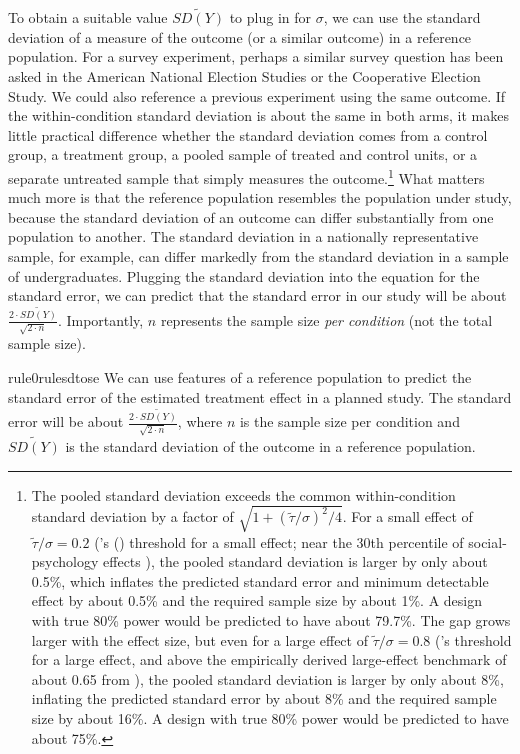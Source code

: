 \documentclass[12pt]{article}
\begin{document}
To obtain a suitable value $\widetilde{SD(Y)}$ to plug in for
$\sigma$, we can use the standard deviation of a measure of the
outcome (or a similar outcome) in a reference population.
For a survey experiment, perhaps a similar survey question has been asked in the American National Election Studies or the Cooperative Election Study.
We could also reference a previous experiment using the same outcome.
If the within-condition standard deviation is about the same in both arms, it makes little practical difference whether the standard deviation comes from a control group, a treatment group, a pooled sample of treated and control units, or a separate untreated sample that simply measures the outcome.\footnote{
  The pooled standard deviation exceeds the common within-condition standard deviation by a factor of $\sqrt{1 + (\widetilde{\tau}/\sigma)^{2}/4}$. 
  For a small effect of $\widetilde{\tau}/\sigma = 0.2$ (\citeauthor{Cohen1988}'s (\citeyear[25]{Cohen1988}) threshold for a small effect; near the 30th percentile of social-psychology effects \citep{Lovakov2021}), the pooled standard deviation is larger by only about 0.5\%, which inflates the predicted standard error and minimum detectable effect by about 0.5\% and the required sample size by about 1\%. 
  A design with true 80\% power would be predicted to have about 79.7\%. 
  The gap grows larger with the effect size, but even for a large effect of $\widetilde{\tau}/\sigma = 0.8$ (\citeauthor{Cohen1988}'s threshold for a large effect, and above the empirically derived large-effect benchmark of about 0.65 from \citealp{Lovakov2021}), the pooled standard deviation is larger by only about 8\%, inflating the predicted standard error by about 8\% and the required sample size by about 16\%. 
  A design with true 80\% power would be predicted to have about 75\%.
  }
What matters much more is that the reference population resembles the population under study, because the standard deviation of an outcome can differ substantially from one population to another.
The standard deviation in a nationally representative sample, for example, can differ markedly from the standard deviation in a sample of undergraduates.
Plugging the standard deviation into the equation for the standard error, we can predict that the standard error in our study will be about $\frac{2 \cdot \widetilde{SD(Y)}}{\sqrt{2 \cdot n}}$.
Importantly, $n$ represents the sample size \textit{per condition} (not the total sample size).

\begin{restatable}[SD to SE]{rule0}{rulesdtose}
\label{rule:sd-to-se}
We can use features of a reference population to predict the standard error of the estimated treatment effect in a planned study. The standard error will be about $\frac{2 \cdot \widetilde{SD(Y)}}{\sqrt{2 \cdot n}}$, where $n$ is the sample size per condition and $\widetilde{SD(Y)}$ is the standard deviation of the outcome in a reference population.
\end{restatable}
\end{document}
